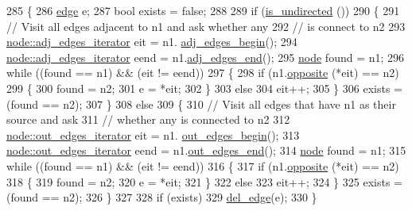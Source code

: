 \begin{DoxyCode}
285 \{
286     \mbox{\hyperlink{classedge}{edge}} e;
287     \textcolor{keywordtype}{bool} exists = \textcolor{keyword}{false};
288     
289     \textcolor{keywordflow}{if} (\mbox{\hyperlink{classgraph_aba427ff8ba0f70c68416ec1351344cd8}{is\_undirected}} ())
290     \{   
291         \textcolor{comment}{// Visit all edges adjacent to n1 and ask whether any}
292         \textcolor{comment}{// is connect to n2}
293         \mbox{\hyperlink{classnode_a12cb1a2167f5f03c054de5e707d3156f}{node::adj\_edges\_iterator}} eit = n1.
      \mbox{\hyperlink{classnode_a788d3e932a5c164caa5ec82aa47551b2}{adj\_edges\_begin}}();
294         \mbox{\hyperlink{classnode_a12cb1a2167f5f03c054de5e707d3156f}{node::adj\_edges\_iterator}} eend = n1.\mbox{\hyperlink{classnode_aa1e7887d29390297580769454f769ad6}{adj\_edges\_end}}();
295         \mbox{\hyperlink{classnode}{node}} found = n1;
296         \textcolor{keywordflow}{while} ((found == n1) && (eit != eend))
297         \{
298             \textcolor{keywordflow}{if} (n1.\mbox{\hyperlink{classnode_a13dbd1809a33a5efede64a359e53a363}{opposite}} (*eit) == n2)
299             \{
300                 found = n2;
301                 e = *eit;
302             \}
303             \textcolor{keywordflow}{else}
304                 eit++;
305         \}
306         exists = (found == n2);
307     \}
308     \textcolor{keywordflow}{else}
309     \{
310         \textcolor{comment}{// Visit all edges that have n1 as their source and ask }
311         \textcolor{comment}{// whether any is connected to n2}
312         \mbox{\hyperlink{classnode_a90e17ed34de55072e8077f4367499a98}{node::out\_edges\_iterator}} eit = n1.
      \mbox{\hyperlink{classnode_a7dcb80df22118cea04f77ca8c952d9c2}{out\_edges\_begin}}();
313         \mbox{\hyperlink{classnode_a90e17ed34de55072e8077f4367499a98}{node::out\_edges\_iterator}} eend = n1.\mbox{\hyperlink{classnode_a7ce2ba5195a63d4df6b44299a02a9378}{out\_edges\_end}}();
314         \mbox{\hyperlink{classnode}{node}} found = n1;
315         \textcolor{keywordflow}{while} ((found == n1) && (eit != eend))
316         \{
317             \textcolor{keywordflow}{if} (n1.\mbox{\hyperlink{classnode_a13dbd1809a33a5efede64a359e53a363}{opposite}} (*eit) == n2)
318             \{
319                 found = n2;
320                 e = *eit;
321             \}
322             \textcolor{keywordflow}{else}
323                 eit++;
324         \}
325         exists = (found == n2);
326     \}
327     
328     \textcolor{keywordflow}{if} (exists)
329         \mbox{\hyperlink{classgraph_ad9356508c49c542dfd4b7169297387c6}{del\_edge}}(e);
330 \}
\end{DoxyCode}
